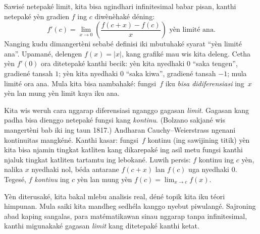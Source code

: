 \documentclass[../../../include/open-logic-section]{subfiles}
\begin{document}
Sawisé netepaké limit,
kita bisa ngindhari infinitesimal
babar pisan, kanthi netepaké
yèn gradien $f$ ing $c$
diwènèhaké déning:
\[
	{f}'(c) = \lim_{x \rightarrow 0}\left(\frac{f(c +x) - f(c)}{x}\right) \text{ yèn limité ana}.
\]
Nanging kudu dimangertèni sebabé
definisi iki mbutuhaké syarat
``yèn limité ana''. Upamané,
delengen $f(x) = |x|$, kang
grafiké mau wis kita deleng.
Cetha yèn $f'(0)$ ora
ditetepaké kanthi becik:
yèn kita nyedhaki $0$
``saka tengen'', gradiené
tansah $1$; yèn kita
nyedhaki $0$ ``saka kiwa'',
gradiené tansah $-1$;
mula limité ora ana.
Mula kita bisa nambahaké:
fungsi~$f$ iku
\emph{bisa didiferensiasi}
ing~$x$ yèn lan mung yèn
limit kaya iku ana.

Kita wis weruh cara nggarap diferensiasi
nganggo gagasan \emph{limit}.
Gagasan kang padha bisa dienggo
netepaké fungsi kang
\emph{kontinu}. (Bolzano sakjané
wis mangertèni bab iki ing taun
1817.) Andharan Cauchy--Weierstrass
ngenani kontinuitas mangkéné.
Kanthi kasar: fungsi~$f$ kontinu
(ing sawijining titik) yèn
kita bisa njamin tingkat katliten
kang dikarepaké ing asil metu
fungsi kanthi njaluk tingkat katliten
tartamtu ing lebokané. Luwih
persis: $f$ kontinu ing $c$
yèn, nalika $x$ nyedhaki
nol, béda antarane $f(c + x)$
lan $f(c)$ uga nyedhaki $0$.
Tegesé, $f$ \emph{kontinu}
ing $c$ yèn lan mung yèn
$f(c) = \lim_{x \rightarrow c} f(x)$.

Yèn diterusaké, kita bakal mlebu
analisis real, déné topik kita
iku téori himpunan. Mula saiki
kita mandheg sedhéla kanggo
nyebut piwulangé. Sajroning
abad kaping sangalas,
para matématikawan sinau
nggarap tanpa infinitesimal,
kanthi migunakaké gagasan
\emph{limit} kang ditetepaké
kanthi ketat.
\end{document}
